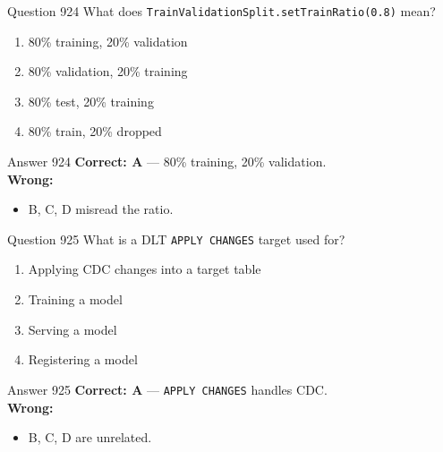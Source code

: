 \documentclass[aspectratio=169,11pt]{beamer}
\begin{document}
	\begin{frame}{Question 924}
		What does \texttt{TrainValidationSplit.setTrainRatio(0.8)} mean?
		\begin{enumerate}[label=\Alph*.]
			\item 80\% training, 20\% validation
			\item 80\% validation, 20\% training
			\item 80\% test, 20\% training
			\item 80\% train, 20\% dropped
		\end{enumerate}
	\end{frame}
	\begin{frame}{Answer 924}
		\textbf{Correct: A} --- 80\% training, 20\% validation.\\
		\vspace{0.5em}
		\textbf{Wrong:}
		\begin{itemize}
			\item B, C, D misread the ratio.
		\end{itemize}
	\end{frame}
	
	\begin{frame}{Question 925}
		What is a DLT \texttt{APPLY CHANGES} target used for?
		\begin{enumerate}[label=\Alph*.]
			\item Applying CDC changes into a target table
			\item Training a model
			\item Serving a model
			\item Registering a model
		\end{enumerate}
	\end{frame}
	\begin{frame}{Answer 925}
		\textbf{Correct: A} --- \texttt{APPLY CHANGES} handles CDC.\\
		\vspace{0.5em}
		\textbf{Wrong:}
		\begin{itemize}
			\item B, C, D are unrelated.
		\end{itemize}
	\end{frame}
	
\end{document}
